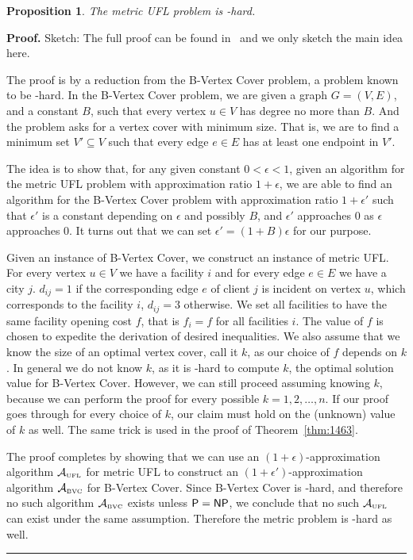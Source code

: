 \documentclass[oneside,final]{ucr}
\newtheorem{proposition}[theorem]{Proposition}
\newenvironment{proof}[1][Proof]{\textbf{#1.} }{\ \rule{0.5em}{0.5em}}
\begin{document}
\begin{proposition}\label{prop:maxsnp} \cite{GuhaK98}
  The metric UFL problem is {\MaxSNP}-hard.
\end{proposition}
\begin{proof}
  Sketch: The full proof can be found in~\cite{GuhaK98} and
  we only sketch the main idea here.

  The proof is by a reduction from the B-Vertex Cover
  problem, a problem known to be {\MaxSNP}-hard. In the
  B-Vertex Cover problem, we are given a graph $G=(V,E)$,
  and a constant $B$, such that every vertex $u\in V$ has
  degree no more than $B$. And the problem asks for a vertex
  cover with minimum size. That is, we are to find a minimum
  set $V' \subseteq V$ such that every edge $e \in E$ has at
  least one endpoint in $V'$.

  The idea is to show that, for any given constant $0 <
  \epsilon < 1$, given an algorithm for the metric UFL
  problem with approximation ratio $1+\epsilon$, we are able
  to find an algorithm for the B-Vertex Cover problem with
  approximation ratio $1+\epsilon'$ such that $\epsilon'$ is
  a constant depending on $\epsilon$ and possibly $B$, and
  $\epsilon'$ approaches $0$ as $\epsilon$ approaches
  $0$. It turns out that we can set $\epsilon' =
  (1+B)\epsilon$ for our purpose.

  Given an instance of B-Vertex Cover, we construct an
  instance of metric UFL. For every vertex $u \in V$ we have
  a facility $i$ and for every edge $e \in E$ we have a city
  $j$. $d_{ij} = 1$ if the corresponding edge $e$ of client
  $j$ is incident on vertex $u$, which corresponds to the
  facility $i$, $d_{ij} = 3$ otherwise. We set all
  facilities to have the same facility opening cost $f$,
  that is $f_i = f$ for all facilities $i$. The value of $f$
  is chosen to expedite the derivation of desired
  inequalities. We also assume that we know the size of an
  optimal vertex cover, call it $k$, as our choice of $f$
  depends on $k$. In general we do not know $k$, as it is
  {\NP}-hard to compute $k$, the optimal solution value for
  B-Vertex Cover. However, we can still proceed assuming
  knowing $k$, because we can perform the proof for every
  possible $k=1,2,\ldots,n$. If our proof goes through for
  every choice of $k$, our claim must hold on the (unknown)
  value of $k$ as well. The same trick is used in the proof
  of Theorem~\ref{thm:1463}.

  The proof completes by showing that we can use an
  $(1+\epsilon)$-approximation algorithm $\calA_{\smallUFL}$
  for metric UFL to construct an
  $(1+\epsilon')$-approximation algorithm
  $\calA_{\smallBVC}$ for B-Vertex Cover. Since B-Vertex
  Cover is \MaxSNP-hard, and therefore no such algorithm
  $\calA_{\smallBVC}$ exists unless ${\mbox{\sf P}}={\mbox{\sf NP}}$, we conclude
  that no such $\calA_{\smallUFL}$ can exist under the same
  assumption. Therefore the metric {\UFL} problem is
  \MaxSNP-hard as well.
\end{proof}
\end{document}
